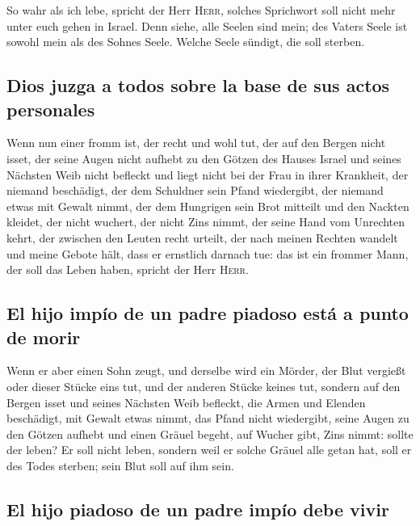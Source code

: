  So wahr als ich lebe, spricht der Herr \textsc{Herr},
solches Sprichwort soll nicht mehr unter euch gehen in Israel.
 Denn siehe, alle Seelen sind mein; des Vaters Seele ist
sowohl mein als des Sohnes Seele. Welche Seele sündigt, die soll
sterben.

\hypertarget{dios-juzga-a-todos-sobre-la-base-de-sus-actos-personales}{%
\subsection{Dios juzga a todos sobre la base de sus actos
personales}\label{dios-juzga-a-todos-sobre-la-base-de-sus-actos-personales}}

 Wenn nun einer fromm ist, der recht und wohl tut,
 der auf den Bergen nicht isset, der seine Augen nicht
aufhebt zu den Götzen des Hauses Israel und seines Nächsten Weib nicht
befleckt und liegt nicht bei der Frau in ihrer Krankheit, 
der niemand beschädigt, der dem Schuldner sein Pfand wiedergibt, der
niemand etwas mit Gewalt nimmt, der dem Hungrigen sein Brot mitteilt und
den Nackten kleidet,  der nicht wuchert, der nicht Zins
nimmt, der seine Hand vom Unrechten kehrt, der zwischen den Leuten recht
urteilt,  der nach meinen Rechten wandelt und meine Gebote
hält, dass er ernstlich darnach tue: das ist ein frommer Mann, der soll
das Leben haben, spricht der Herr \textsc{Herr}.

\hypertarget{el-hijo-impuxedo-de-un-padre-piadoso-estuxe1-a-punto-de-morir}{%
\subsection{El hijo impío de un padre piadoso está a punto de
morir}\label{el-hijo-impuxedo-de-un-padre-piadoso-estuxe1-a-punto-de-morir}}

 Wenn er aber einen Sohn zeugt, und derselbe wird ein
Mörder, der Blut vergießt oder dieser Stücke eins tut, 
und der anderen Stücke keines tut, sondern auf den Bergen isset und
seines Nächsten Weib befleckt,  die Armen und Elenden
beschädigt, mit Gewalt etwas nimmt, das Pfand nicht wiedergibt, seine
Augen zu den Götzen aufhebt und einen Gräuel begeht,  auf
Wucher gibt, Zins nimmt: sollte der leben? Er soll nicht leben, sondern
weil er solche Gräuel alle getan hat, soll er des Todes sterben; sein
Blut soll auf ihm sein.

\hypertarget{el-hijo-piadoso-de-un-padre-impuxedo-debe-vivir}{%
\subsection{El hijo piadoso de un padre impío debe
vivir}\label{el-hijo-piadoso-de-un-padre-impuxedo-debe-vivir}}

